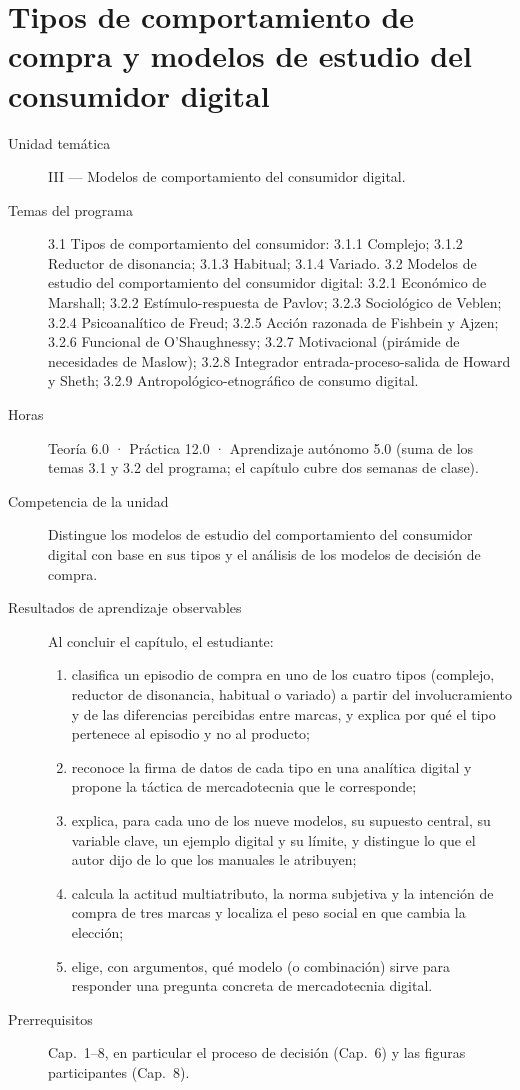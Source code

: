 \chapter{Tipos de comportamiento de compra y modelos de estudio del consumidor digital}
\label{cap:09}

\begin{cajaFicha}
\begin{description}
  \item[Unidad temática] III — Modelos de comportamiento del consumidor digital.
  \item[Temas del programa] 3.1 Tipos de comportamiento del consumidor: 3.1.1 Complejo; 3.1.2 Reductor de disonancia; 3.1.3 Habitual; 3.1.4 Variado. 3.2 Modelos de estudio del comportamiento del consumidor digital: 3.2.1 Económico de Marshall; 3.2.2 Estímulo-respuesta de Pavlov; 3.2.3 Sociológico de Veblen; 3.2.4 Psicoanalítico de Freud; 3.2.5 Acción razonada de Fishbein y Ajzen; 3.2.6 Funcional de O'Shaughnessy; 3.2.7 Motivacional (pirámide de necesidades de Maslow); 3.2.8 Integrador entrada-proceso-salida de Howard y Sheth; 3.2.9 Antropológico-etnográfico de consumo digital.
  \item[Horas] Teoría 6.0 · Práctica 12.0 · Aprendizaje autónomo 5.0 (suma de los temas 3.1 y 3.2 del programa; el capítulo cubre dos semanas de clase).
  \item[Competencia de la unidad] Distingue los modelos de estudio del comportamiento del consumidor digital con base en sus tipos y el análisis de los modelos de decisión de compra.
  \item[Resultados de aprendizaje observables] Al concluir el capítulo, el estudiante:
  \begin{enumerate}
    \item clasifica un episodio de compra en uno de los cuatro tipos (complejo, reductor de disonancia, habitual o variado) a partir del involucramiento y de las diferencias percibidas entre marcas, y explica por qué el tipo pertenece al episodio y no al producto;
    \item reconoce la firma de datos de cada tipo en una analítica digital y propone la táctica de mercadotecnia que le corresponde;
    \item explica, para cada uno de los nueve modelos, su supuesto central, su variable clave, un ejemplo digital y su límite, y distingue lo que el autor dijo de lo que los manuales le atribuyen;
    \item calcula la actitud multiatributo, la norma subjetiva y la intención de compra de tres marcas y localiza el peso social en que cambia la elección;
    \item elige, con argumentos, qué modelo (o combinación) sirve para responder una pregunta concreta de mercadotecnia digital.
  \end{enumerate}
  \item[Prerrequisitos] Cap.~1--8, en particular el proceso de decisión (Cap.~6) y las figuras participantes (Cap.~8).
\end{description}
\end{cajaFicha}

